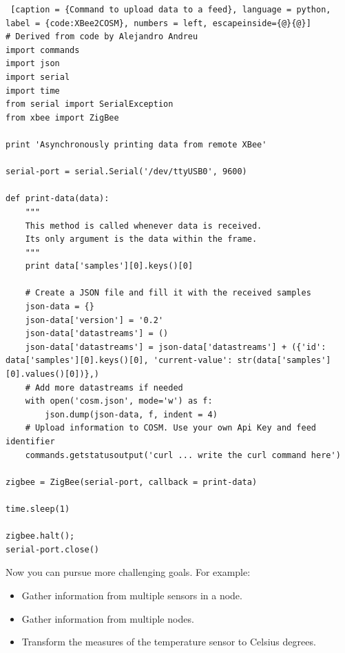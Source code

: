 \begin{lstlisting} [caption = {Command to upload data to a feed}, language = python, label = {code:XBee2COSM}, numbers = left, escapeinside={@}{@}]
# Derived from code by Alejandro Andreu
import commands
import json
import serial
import time
from serial import SerialException
from xbee import ZigBee

print 'Asynchronously printing data from remote XBee'

serial-port = serial.Serial('/dev/ttyUSB0', 9600)

def print-data(data):
    """
    This method is called whenever data is received.
    Its only argument is the data within the frame.
    """
    print data['samples'][0].keys()[0]

    # Create a JSON file and fill it with the received samples
    json-data = {}
    json-data['version'] = '0.2'
    json-data['datastreams'] = ()
    json-data['datastreams'] = json-data['datastreams'] + ({'id': data['samples'][0].keys()[0], 'current-value': str(data['samples'][0].values()[0])},)
    # Add more datastreams if needed
    with open('cosm.json', mode='w') as f:
        json.dump(json-data, f, indent = 4)
    # Upload information to COSM. Use your own Api Key and feed identifier
    commands.getstatusoutput('curl ... write the curl command here')

zigbee = ZigBee(serial-port, callback = print-data)

time.sleep(1)

zigbee.halt();
serial-port.close()
\end{lstlisting}

Now you can pursue more challenging goals.
For example:
\begin{itemize}
\item Gather information from multiple sensors in a node.
\item Gather information from multiple nodes.
\item Transform the measures of the temperature sensor to Celsius degrees.
\end{itemize}

